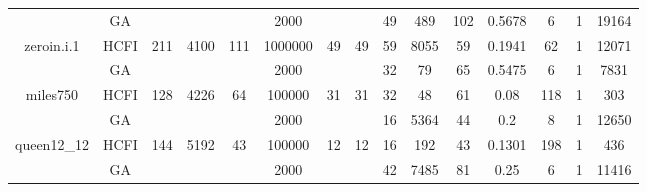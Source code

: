 \documentclass[10pt]{article}
\begin{document}
\begin{center}
\begin{table}[H]
\begin{tabular}{|c|c|c|c|c|c|c|c|c|c|c|c|c|c|c|}
	&GA&       &                   &                     &  2000       &     \cellcolor{yellow} & {\cellcolor{yellow}}& {{\cellcolor{green}49}}
&489   &102        &0.5678                   &6                    &1          &19164        \\ \cline{2-2} \cline{6-6} \cline{9-15}
 \multirow{-2}{*}{zeroin.i.1} &HCFI   &\multirow{-2}{*}{211}   &\multirow{-2}{*}{4100}     &\multirow{-2}{*}{111}     &1000000     &\multirow{-2}{*}{\cellcolor{yellow}49}      & \multirow{-2}{*}{\cellcolor{yellow}49}    &{\cellcolor{green}59}     &8055         & 59   &0.1941          &62    &1     &12071        \\ \hline \hline
	&GA&       &                   &                     &   2000      &     \cellcolor{yellow} & {\cellcolor{yellow}}& {{\cellcolor{green}32}}
&79   &65        &0.5475                    & 6                   &1          & 7831       \\ \cline{2-2} \cline{6-6} \cline{9-15}
 \multirow{-2}{*}{miles750} &HCFI   &\multirow{-2}{*}{128}   &\multirow{-2}{*}{4226}     &\multirow{-2}{*}{64}     &100000     &\multirow{-2}{*}{\cellcolor{yellow}31}      & \multirow{-2}{*}{\cellcolor{yellow}31}    &{\cellcolor{green}32}     &48         &61    &0.08         &   118 &1     & 303       \\ \hline \hline
	&GA&       &                   &                     &   2000      &     \cellcolor{yellow} & {\cellcolor{yellow}}& {{\cellcolor{green}16}}
&5364   &44        &0.2                   &8                    &1          &12650        \\ \cline{2-2} \cline{6-6} \cline{9-15}
 \multirow{-2}{*}{queen12\_12} &HCFI   &\multirow{-2}{*}{144}   &\multirow{-2}{*}{5192}     &\multirow{-2}{*}{43}     &100000     &\multirow{-2}{*}{\cellcolor{yellow}12}      & \multirow{-2}{*}{\cellcolor{yellow}12}    &{\cellcolor{green}16}     &192         &43    &0.1301         &198    &1     &436        \\ \hline \hline
	&GA&       &                   &                     &   2000      &     \cellcolor{yellow} & {\cellcolor{yellow}}& {{\cellcolor{green}42}}
&7485  &81        &0.25                   &6                    & 1         &11416        \\ \cline{2-2} \cline{6-6} \cline{9-15}

\end{tabular}
\end{table}
\end{center}
\end{document}
